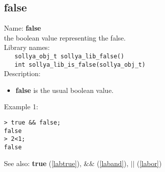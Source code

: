 \subsection{false}
\label{labfalse}
\noindent Name: \textbf{false}\\
\phantom{aaa}the boolean value representing the false.\\[0.2cm]
\noindent Library names:\\
\verb|   sollya_obj_t sollya_lib_false()|\\
\verb|   int sollya_lib_is_false(sollya_obj_t)|\\[0.2cm]
\noindent Description: \begin{itemize}

\item \textbf{false} is the usual boolean value.
\end{itemize}
\noindent Example 1: 
\begin{center}\begin{minipage}{15cm}\begin{Verbatim}[frame=single]
> true && false;
false
> 2<1;
false
\end{Verbatim}
\end{minipage}\end{center}
See also: \textbf{true} (\ref{labtrue}), \textbf{$\&\&$} (\ref{laband}), \textbf{$||$} (\ref{labor})
